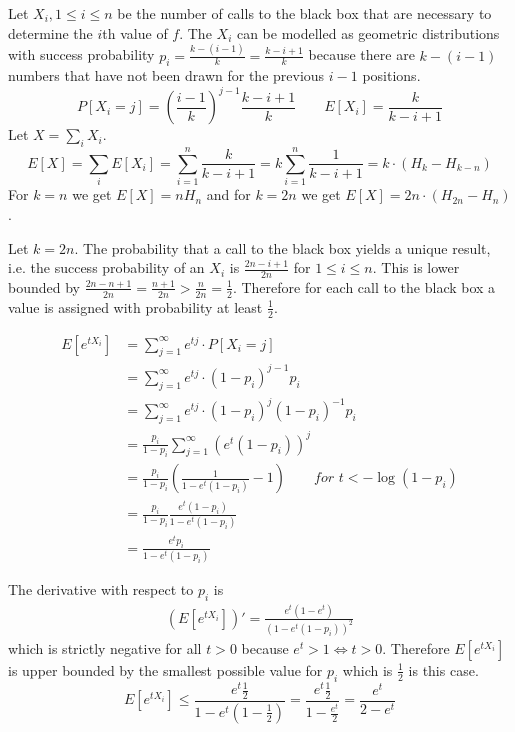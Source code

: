 \documentclass[10pt,a4paper]{article}
\begin{document}
Let $X_{i}, 1 \le i \le n$ be the number of calls to the black box that are necessary to determine the $i$th value of $f$.
The $X_{i}$ can be modelled as geometric distributions with success probability $p_{i} = \frac{k - (i - 1)}{k} = \frac{k - i + 1}{k}$ because there are $k - (i - 1)$ numbers that have not been drawn for the previous $i - 1$ positions.
\begin{equation*}
  P[X_{i} = j] = \left( \frac{i - 1}{k} \right)^{j - 1}\frac{k - i + 1}{k} \qquad E[X_{i}] = \frac{k}{k - i + 1}
\end{equation*}
Let $X = \sum_{i} X_{i}$.
\begin{equation*}
  E[X] = \sum_{i} E[X_{i}] = \sum_{i = 1}^{n} \frac{k}{k - i + 1} = k \sum_{i = 1}^{n} \frac{1}{k - i + 1} = k \cdot \left( H_{k} - H_{k - n} \right)
\end{equation*}
For $k = n$ we get $E[X] = n H_{n}$ and for $k = 2n$ we get $E[X] = 2n \cdot (H_{2n} - H_{n})$.

Let $k = 2n$.
The probability that a call to the black box yields a unique result, i.e. the success probability of an $X_{i}$ is $\frac{2n - i + 1}{2n}$ for $1 \le i \le n$.
This is lower bounded by $\frac{2n - n + 1}{2n} = \frac{n + 1}{2n} > \frac{n}{2n} = \frac{1}{2}$.
Therefore for each call to the black box a value is assigned with probability at least $\frac{1}{2}$.

\begin{align*}
  E[e^{tX_{i}}] & = \sum_{j = 1}^{\infty} e^{tj} \cdot P[X_{i} = j]\\
                & = \sum_{j = 1}^{\infty} e^{tj} \cdot \left( 1 - p_{i} \right)^{j - 1}p_{i}\\
                & = \sum_{j = 1}^{\infty} e^{tj} \cdot (1 - p_{i})^{j} (1 - p_{i})^{-1} p_{i}\\
                & = \frac{p_{i}}{1 - p_{i}} \sum_{j = 1}^{\infty} \left( e^{t}(1 - p_{i}) \right)^{j}\\
                & = \frac{p_{i}}{1 - p_{i}} \left( \frac{1}{1 - e^{t}(1 - p_{i})}  - 1\right) \qquad \textit{for $t < -\log(1 - p_{i})$}\\
                & = \frac{p_{i}}{1 - p_{i}} \frac{e^{t}(1 - p_{i})}{1 - e^{t}(1 - p_{i})}\\
                & = \frac{e^{t}p_{i}}{1 - e^{t}(1 - p_{i})}
\end{align*}

The derivative with respect to $p_{i}$ is
\begin{align*}
  \left( E[e^{tX_{i}}] \right)' = \frac{e^{t}(1 - e^{t})}{\left( 1 - e^{t}(1 - p_{i}) \right)^{2}}
\end{align*}
which is strictly negative for all $t > 0$ because $e^{t} > 1 \Leftrightarrow t > 0$.
Therefore $E[e^{tX_{i}}]$ is upper bounded by the smallest possible value for $p_{i}$ which is $\frac{1}{2}$ is this case.
\begin{equation*}
  E[e^{tX_{i}}] \le \frac{e^{t}\frac{1}{2}}{1 - e^{t}(1 - \frac{1}{2})} = \frac{e^{t}\frac{1}{2}}{1 - \frac{e^{t}}{2}} = \frac{e^{t}}{2 - e^{t}}
\end{equation*}
\end{document}
